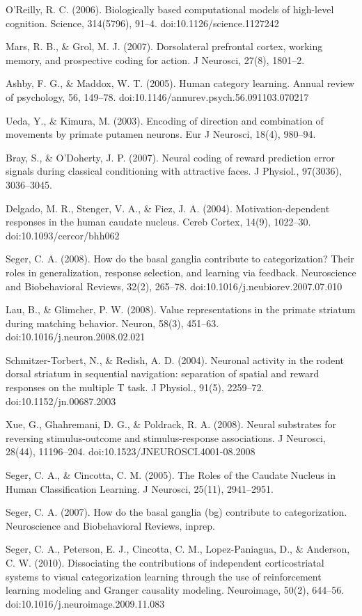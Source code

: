 O'Reilly, R. C. (2006). Biologically based computational models of high-level cognition. Science, 314(5796), 91–4. doi:10.1126/science.1127242

Mars, R. B., & Grol, M. J. (2007). Dorsolateral prefrontal cortex, working memory, and prospective coding for action. J Neurosci, 27(8), 1801–2.

Ashby, F. G., & Maddox, W. T. (2005). Human category learning. Annual review of psychology, 56, 149–78. doi:10.1146/annurev.psych.56.091103.070217

Ueda, Y., & Kimura, M. (2003). Encoding of direction and combination of movements by primate putamen neurons. Eur J Neurosci, 18(4), 980–94.

Bray, S., & O'Doherty, J. P. (2007). Neural coding of reward prediction error signals during classical conditioning with attractive faces. J Physiol., 97(3036), 3036–3045.

Delgado, M. R., Stenger, V. A., & Fiez, J. A. (2004). Motivation-dependent responses in the human caudate nucleus. Cereb Cortex, 14(9), 1022–30. doi:10.1093/cercor/bhh062

Seger, C. A. (2008). How do the basal ganglia contribute to categorization? Their roles in generalization, response selection, and learning via feedback. Neuroscience and Biobehavioral Reviews, 32(2), 265–78. doi:10.1016/j.neubiorev.2007.07.010

Lau, B., & Glimcher, P. W. (2008). Value representations in the primate striatum during matching behavior. Neuron, 58(3), 451–63. doi:10.1016/j.neuron.2008.02.021

Schmitzer-Torbert, N., & Redish, A. D. (2004). Neuronal activity in the rodent dorsal striatum in sequential navigation: separation of spatial and reward responses on the multiple T task. J Physiol., 91(5), 2259–72. doi:10.1152/jn.00687.2003

Xue, G., Ghahremani, D. G., & Poldrack, R. A. (2008). Neural substrates for reversing stimulus-outcome and stimulus-response associations. J Neurosci, 28(44), 11196–204. doi:10.1523/JNEUROSCI.4001-08.2008

Seger, C. A., & Cincotta, C. M. (2005). The Roles of the Caudate Nucleus in Human Classification Learning. J Neurosci, 25(11), 2941–2951.

Seger, C. A. (2007). How do the basal ganglia (bg) contribute to categorization. Neuroscience and Biobehavioral Reviews, inprep.

Seger, C. A., Peterson, E. J., Cincotta, C. M., Lopez-Paniagua, D., & Anderson, C. W. (2010). Dissociating the contributions of independent corticostriatal systems to visual categorization learning through the use of reinforcement learning modeling and Granger causality modeling. Neuroimage, 50(2), 644–56. doi:10.1016/j.neuroimage.2009.11.083

